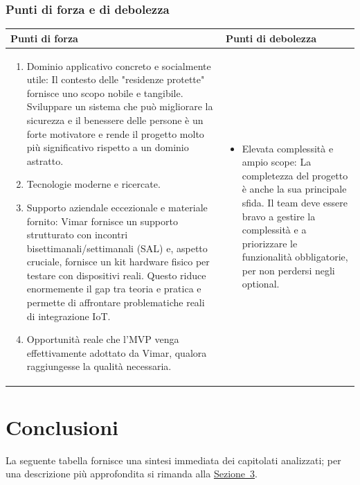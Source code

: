 \documentclass[a4paper,11pt]{article}
\begin{document}
\subsubsection{Punti di forza e di debolezza}
{\footnotesize
\begin{tabularx}{\textwidth}{|X|X|}
\hline
\rowcolor{lightgray!40} %
\textbf{Punti di forza} & \textbf{Punti di debolezza} \\
\hline
\begin{enumerate}
\item Dominio applicativo concreto e socialmente utile: Il contesto delle "residenze protette" fornisce uno scopo nobile e tangibile. Sviluppare un sistema che può migliorare la sicurezza e il benessere delle persone è un forte motivatore e rende il progetto molto più significativo rispetto a un dominio astratto.
\item Tecnologie moderne e ricercate.
\item Supporto aziendale eccezionale e materiale fornito: Vimar fornisce un supporto strutturato con incontri bisettimanali/settimanali (SAL) e, aspetto cruciale, fornisce un kit hardware fisico per testare con dispositivi reali. Questo riduce enormemente il gap tra teoria e pratica e permette di affrontare problematiche reali di integrazione IoT.
\item Opportunità reale che l'MVP venga effettivamente adottato da Vimar, qualora raggiungesse la qualità necessaria.
\end{enumerate}
 & \begin{itemize}
\item Elevata complessità e ampio scope: La completezza del progetto è anche la sua principale sfida. Il team deve essere bravo a gestire la complessità e a priorizzare le funzionalità obbligatorie, per non perdersi negli optional.
\end{itemize} \\
\hline
\end{tabularx}
}
\newpage
\section{Conclusioni}
La seguente tabella fornisce una sintesi immediata dei capitolati analizzati; per una descrizione più approfondita si rimanda alla \hyperref[sec:elenco_capitolati]{Sezione~3}.

\setlength{\extrarowheight}{2pt}
\renewcommand{\arraystretch}{1.5}
\end{document}
